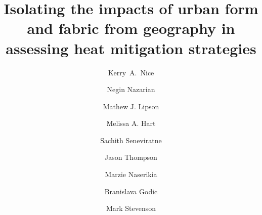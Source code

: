 \documentclass[final,3p,times,authoryear]{elsarticle}
\begin{document}
\title{Isolating the impacts of urban form and fabric from geography in assessing heat mitigation strategies }

\author[melb]{Kerry~A.~Nice}
\author[arc,built]{Negin Nazarian}
\author[arc]{Mathew J. Lipson}
\author[arc]{Melissa A. Hart}
\author[melb]{Sachith Seneviratne}
\author[melb]{Jason Thompson}
\author[arc]{Marzie Naserikia}
\author[melb]{Branislava Godic}
\author[melb,eng]{Mark Stevenson}
\address[melb]{Transport, Health, and Urban Design Research Lab, Faculty of Architecture, Building, and Planning, University of Melbourne, VIC, Australia.}
\address[arc]{ARC Centre of Excellence for Climate Extremes, University of New South Wales, Sydney, NSW, Australia.}
\address[built]{School of Built Environment; and City Futures Research Centre, University of New South Wales, Sydney, NSW, Australia.}
\address[eng]{Melbourne School of Engineering; and Melbourne School of Population and Global Health, University of Melbourne, VIC, Australia.}
\end{document}
